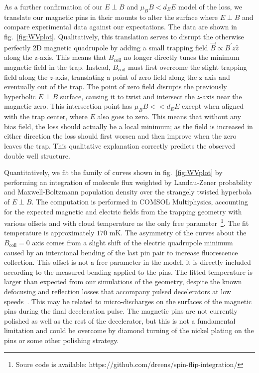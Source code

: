 \documentclass[%
 reprint,
groupedaddress,
 amsmath,amssymb,
 aps,
prl,
]{revtex4-1}
\newcommand{\epb}{$E\!\perp\!B$}
\begin{document}
As a further confirmation of our \epb{}  and $\mu_BB<d_EE$ model of the loss, we translate our magnetic pins in their mounts to alter the surface where \epb{}  and compare experimental data against our expectations. The data are shown in fig.~\ref{fig:WVplot}. Qualitatively, this translation serves to disrupt the otherwise perfectly 2D magnetic quadrupole by adding a small trapping field $\vec{B}\propto B^\prime z\hat{z}$ along the z-axis. This means that $B_\text{coil}$ no longer directly tunes the minimum magnetic field in the trap. Instead, $B_\text{coil}$ must first overcome the slight trapping field along the $z$-axis, translating a point of zero field along the z axis and eventually out of the trap. The point of zero field disrupts the previously hyperbolic \epb{} surface, causing it to twist and intersect the $z$-axis near the magnetic zero. This intersection point has $\mu_BB<< d_EE$ except when aligned with the trap center, where $E$ also goes to zero. This means that without any bias field, the loss should actually be a local minimum; as the field is increased in either direction the loss should first worsen and then improve when the zero leaves the trap. This qualitative explanation correctly predicts the observed double well structure.

Quantitatively, we fit the family of curves shown in fig.~\ref{fig:WVplot} by performing an integration of molecule flux weighted by Landau-Zener probability and Maxwell-Boltzmann population density over the strangely twisted hyperbola of \epb. The computation is performed in COMSOL Multiphysics, accounting for the expected magnetic and electric fields from the trapping geometry with various offsets and with cloud temperature as the only free parameter~\footnote{Soure code is available: https://github.com/dreens/spin-flip-integration/}. The fit temperature is approximately $170\text{ mK}$. The asymmetry of the curves about the $B_\text{coil}=0$ axis comes from a slight shift of the electric quadrupole minimum caused by an intentional bending of the last pin pair to increase fluorescence collection. This offset is not a free parameter in the model, it is directly included according to the measured bending applied to the pins. The fitted temperature is larger than expected from our simulations of the geometry, despite the known defocusing and reflection losses that accompany pulsed decelerators at low speeds~\cite{Sawyer2008a}. This may be related to micro-discharges on the surfaces of the magnetic pins during the final deceleration pulse. The magnetic pins are not currently polished as well as the rest of the decelerator, but this is not a fundamental limitation and could be overcome by diamond turning of the nickel plating on the pins or some other polishing strategy.
\end{document}
